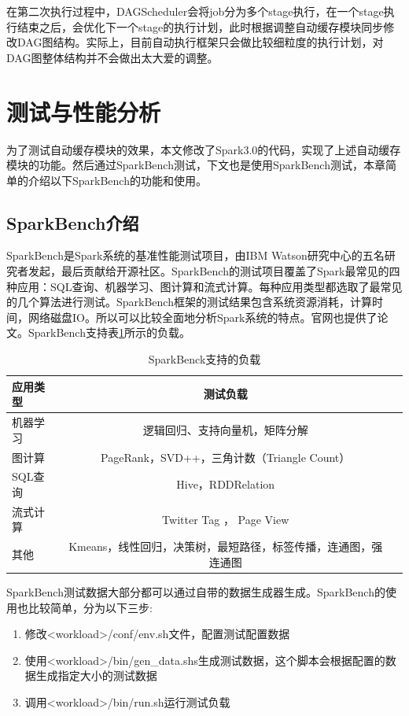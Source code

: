 在第二次执行过程中，DAGScheduler会将job分为多个stage执行，在一个stage执行结束之后，会优化下一个stage的执行计划，此时根据调整自动缓存模块同步修改DAG图结构。实际上，目前自动执行框架只会做比较细粒度的执行计划，对DAG图整体结构并不会做出太大爱的调整。

\section{测试与性能分析}

为了测试自动缓存模块的效果，本文修改了Spark3.0的代码，实现了上述自动缓存模块的功能。然后通过SparkBench测试，下文也是使用SparkBench测试，本章简单的介绍以下SparkBench的功能和使用。

\subsection{SparkBench介绍}

SparkBench是Spark系统的基准性能测试项目，由IBM Watson研究中心的五名研究者发起，最后贡献给开源社区。SparkBench的测试项目覆盖了Spark最常见的四种应用：SQL查询、机器学习、图计算和流式计算。每种应用类型都选取了最常见的几个算法进行测试。SparkBench框架的测试结果包含系统资源消耗，计算时间，网络磁盘IO。所以可以比较全面地分析Spark系统的特点。官网也提供了论文。SparkBench支持表\ref{tab:workload}所示的负载。

\begin{table}
 \centering
 \caption{SparkBenck支持的负载}
 \label{tab:workload}
 \begin{tabular}{lcl}
  \toprule
  应用类型 & 测试负载 \\
  \midrule
  机器学习 & 逻辑回归、支持向量机，矩阵分解  \\
  图计算 &  PageRank，SVD++，三角计数（Triangle Count） \\
  SQL查询 & Hive，RDDRelation  \\
  流式计算 & Twitter Tag ， Page View  \\
  其他 &  Kmeans，线性回归，决策树，最短路径，标签传播，连通图，强连通图 \\
  \bottomrule
 \end{tabular}
\end{table}

SparkBench测试数据大部分都可以通过自带的数据生成器生成。SparkBench的使用也比较简单，分为以下三步:

\begin{enumerate}
    \item 修改<workload>/conf/env.sh文件，配置测试配置数据
    \item 使用<workload>/bin/gen\_data.shs生成测试数据，这个脚本会根据配置的数据生成指定大小的测试数据
    \item 调用<workload>/bin/run.sh运行测试负载
\end{enumerate}

